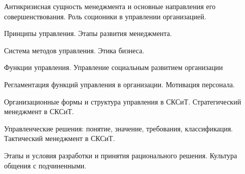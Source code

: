 \documentclass[
	14pt,
	a4paper,
	]
	{scrartcl}
\begin{document}
\shapk
{}
\setcounter{zad}{0}

\vfill
\z Антикризисная сущность менеджмента и основные направления его совершенствования.
 \vfill
\z Роль соционики в управлении организацией. \vfill

\vfill

\newpage


\shapk
{}
\setcounter{zad}{0}

\vfill
\z Принципы управления.
 \vfill
\z Этапы развития менеджмента.
 \vfill

\vfill

\newpage


\shapk
{}
\setcounter{zad}{0}

\vfill
\z Система методов управления.
 \vfill
\z Этика бизнеса.
 \vfill

\vfill

\newpage


\shapk
{}
\setcounter{zad}{0}

\vfill
\z Функции управления.
 \vfill
\z Управление социальным развитием организации
 \vfill

\vfill

\newpage


\shapk
{}
\setcounter{zad}{0}

\vfill
\z Регламентация функций управления в организации.
 \vfill
\z Мотивация персонала.
 \vfill

\vfill

\newpage


\shapk
{}
\setcounter{zad}{0}

\vfill
\z Организационные формы и структура управления в СКСиТ.
 \vfill
\z Стратегический менеджмент в СКСиТ.
 \vfill

\vfill

\newpage


\shapk
{}
\setcounter{zad}{0}

\vfill
\z Управленческие решения: понятие, значение, требования, классификация.
 \vfill
\z Тактический менеджмент в СКСиТ.
 \vfill

\vfill

\newpage


\shapk
{}
\setcounter{zad}{0}

\vfill
\z Этапы и условия разработки и принятия рационального решения.
 \vfill
\z Культура общения с подчиненными.
 \vfill
\end{document}
